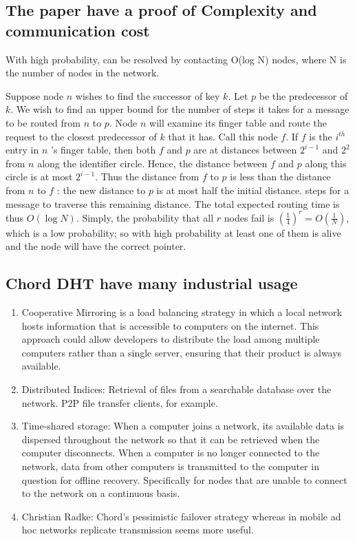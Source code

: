 \documentclass[acmlarge]{acmart}
\begin{document}
\subsection{The paper have a proof of Complexity and communication cost}
With high probability, can be resolved by contacting O(log N) nodes, where N is the number of nodes in the network.

Suppose node $n$ wishes to find the successor of key $k$. Let $p$ be the predecessor of $k$. We wish to find an upper bound for the number of steps it takes for a message to be routed from $n$ to $p$. Node $n$ will examine its finger table and route the request to the closest predecessor of $k$ that it has. Call this node $f$. If $f$ is the $i^{t h}$ entry in $n$ 's finger table, then both $f$ and $p$ are at distances between $2^{i-1}$ and $2^{2}$ from $n$ along the identifier circle. Hence, the distance between $f$ and $p$ along this circle is at
most $2^{i-1}$. Thus the distance from $f$ to $p$ is less than the distance from $n$ to $f$ : the new distance to $p$ is at most half the initial distance. steps for a message to traverse this remaining distance. The total expected routing time is thus $O(\log N)$.
Simply, the probability that all $r$ nodes fail is $\left(\frac{1}{4}\right)^{r}=O\left(\frac{1}{N}\right)$, which is a low probability; so with high probability at least one of them is alive and the node will have the correct pointer.

\subsection{Chord DHT have many industrial usage}
\begin{enumerate}
  \item Cooperative Mirroring is a load balancing strategy in which a local network hosts information that is accessible to computers on the internet. This approach could allow developers to distribute the load among multiple computers rather than a single server, ensuring that their product is always available.
  \item Distributed Indices: Retrieval of files from a searchable database over the network. P2P file transfer clients, for example.
  \item Time-shared storage: When a computer joins a network, its available data is dispersed throughout the network so that it can be retrieved when the computer disconnects. When a computer is no longer connected to the network, data from other computers is transmitted to the computer in question for offline recovery. Specifically for nodes that are unable to connect to the network on a continuous basis.
  \item Christian Radke: Chord's pessimistic failover strategy whereas in mobile ad hoc networks replicate transmission seems more useful.
\end{enumerate}
\end{document}
